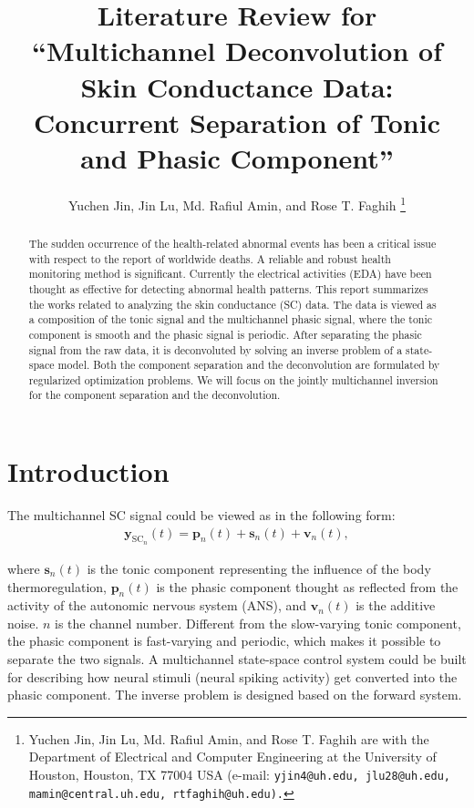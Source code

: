 \documentclass[10pt,conference]{ieeeconf}
\providecommand{\rm}{\mathrm}
\begin{document}
\title{Literature Review for ``Multichannel Deconvolution of Skin Conductance Data: Concurrent Separation of Tonic and Phasic Component''}


\author{Yuchen Jin, Jin Lu, Md. Rafiul Amin, and Rose T. Faghih \thanks{Yuchen Jin, Jin Lu, Md. Rafiul Amin, and Rose T. Faghih are with the Department of Electrical and Computer Engineering at the University of Houston, Houston, TX 77004 USA (e-mail: \tt\small  yjin4@uh.edu, jlu28@uh.edu, mamin@central.uh.edu, rtfaghih@uh.edu).} 
}

\maketitle

\begin{abstract}

The sudden occurrence of the health-related abnormal events has been a critical issue with respect to the report of worldwide deaths. A reliable and robust health monitoring method is significant. Currently the electrical activities (EDA) have been thought as effective for detecting abnormal health patterns. This report summarizes the works related to analyzing the skin conductance (SC) data. The data is viewed as a composition of the tonic signal and the multichannel phasic signal, where the tonic component is smooth and the phasic signal is periodic. After separating the phasic signal from the raw data, it is deconvoluted by solving an inverse problem of a state-space model. Both the component separation and the deconvolution are formulated by regularized optimization problems. We will focus on the jointly multichannel inversion for the component separation and the deconvolution.

\end{abstract}

\section{Introduction} \label{introduction}

The multichannel SC signal could be viewed as in the following form:
\begin{align}
  \mathbf{y}_{\rm{SC}_n}(t) = \mathbf{p}_n(t) + \mathbf{s}_n(t) + \mathbf{v}_n(t),
\end{align}

where $\mathbf{s}_n(t)$ is the tonic component representing the influence of the body thermoregulation, $\mathbf{p}_n(t)$ is the phasic component thought as reflected from the activity of the autonomic nervous system (ANS), and $\mathbf{v}_n(t)$ is the additive noise. $n$ is the channel number. Different from the slow-varying tonic component, the phasic component is fast-varying and periodic, which makes it possible to separate the two signals. A multichannel state-space control system could be built for describing how neural stimuli (neural spiking activity) get converted into the phasic component. The inverse problem is designed based on the forward system.
\end{document}
